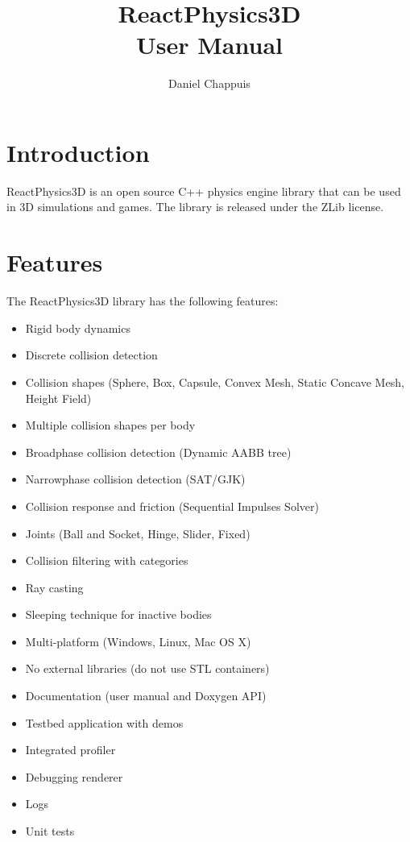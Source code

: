 \documentclass[a4paper,12pt]{article}
\begin{document}
   \author{Daniel Chappuis}
   \title{ReactPhysics3D \\ User Manual}
   \maketitle

   \tableofcontents

   \newpage


   \section{Introduction}

  ReactPhysics3D is an open source C++ physics engine library that can be used
  in 3D simulations and games. The library is released under the ZLib license.

   \section{Features}

   The ReactPhysics3D library has the following features:

   \begin{itemize}
    \item Rigid body dynamics
    \item Discrete collision detection
    \item Collision shapes (Sphere, Box, Capsule, Convex Mesh, Static Concave Mesh, Height Field)
    \item Multiple collision shapes per body
    \item Broadphase collision detection (Dynamic AABB tree)
    \item Narrowphase collision detection (SAT/GJK)
    \item Collision response and friction (Sequential Impulses Solver)
    \item Joints (Ball and Socket, Hinge, Slider, Fixed)
    \item Collision filtering with categories
    \item Ray casting
    \item Sleeping technique for inactive bodies
    \item Multi-platform (Windows, Linux, Mac OS X)
    \item No external libraries (do not use STL containers)
    \item Documentation (user manual and Doxygen API)
    \item Testbed application with demos
    \item Integrated profiler
    \item Debugging renderer
    \item Logs
    \item Unit tests
   \end{itemize}
\end{document}

